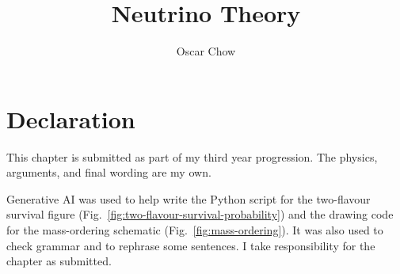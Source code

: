 \documentclass[11pt]{article}
\title{Neutrino Theory}
\author{Oscar Chow}
\date{}
\numberwithin{equation}{subsection}
\begin{document}
\maketitle

\section*{Declaration}
This chapter is submitted as part of my third year progression. The physics, arguments, and final wording are my own.

Generative AI was used to help write the Python script for the two-flavour survival figure (Fig.~\ref{fig:two-flavour-survival-probability}) and the drawing code for the mass-ordering schematic (Fig.~\ref{fig:mass-ordering}). It was also used to check grammar and to rephrase some sentences. I take responsibility for the chapter as submitted.

\tableofcontents
\clearpage




% 


\clearpage


\end{document}
